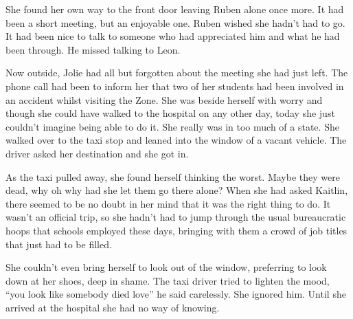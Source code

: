 She found her own way to the front door leaving Ruben alone once more.  It had been a short meeting, but an enjoyable one.  Ruben wished she hadn't had to go.  It had been nice to talk to someone who had appreciated him and what he had been through.  He missed talking to Leon.

Now outside, Jolie had all but forgotten about the meeting she had just left.  The phone call had been to inform her that two of her students had been involved in an accident whilst visiting the Zone.  She was beside herself with worry and though she could have walked to the hospital on any other day, today she just couldn't imagine being able to do it.  She really was in too much of a state.  She walked over to the taxi stop and leaned into the window of a vacant vehicle.  The driver asked her destination and she got in.

As the taxi pulled away, she found herself thinking the worst.  Maybe they were dead, why oh why had she let them go there alone?  When she had asked Kaitlin, there seemed to be no doubt in her mind that it was the right thing to do.  It wasn't an official trip, so she hadn't had to jump through the usual bureaucratic hoops that schools employed these days, bringing with them a crowd of job titles that just had to be filled. 

She couldn't even bring herself to look out of the window, preferring to look down at her shoes, deep in shame.  The taxi driver tried to lighten the mood, ``you look like somebody died love'' he said carelessly.  She ignored him.  Until she arrived at the hospital she had no way of knowing.  

